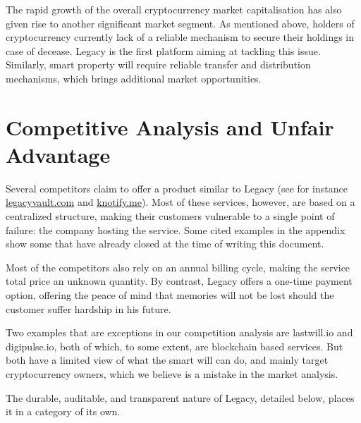 The rapid growth of the overall cryptocurrency market capitalisation has also given rise to another significant market segment. As mentioned above, holders of cryptocurrency currently lack of a reliable mechanism to secure their holdings in case of decease. Legacy is the first platform aiming at tackling this issue. Similarly, smart property will require reliable transfer and distribution mechanisms, which brings additional market opportunities. 


\section{Competitive Analysis and Unfair Advantage} %
\label{sec:competitive_analysis_and_unfair_advantage}

Several competitors claim to offer a product similar to Legacy (see for instance \url{legacyvault.com} and \url{knotify.me}). Most of these services, however, are based on a centralized structure, making their customers vulnerable to a single point of failure: the company hosting the service. Some cited examples in the appendix show some that have already closed at the time of writing this document.

Most of the competitors also rely on an annual billing cycle, making the service total price an unknown quantity. By contrast, Legacy offers a one-time payment option, offering the peace of mind that memories will not be lost should the customer suffer hardship in his future.

Two examples that are exceptions in our competition analysis are lastwill.io and digipulse.io, both of which, to some extent, are blockchain based services. But both have a limited view of what the smart will can do, and mainly target cryptocurrency owners, which we believe is a mistake in the market analysis.

The durable, auditable, and transparent nature of Legacy, detailed below, places it in a category of its own.

